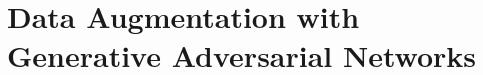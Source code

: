 \chapter[Data Augmentation with Generative Adversarial Networks]{Data
Augmentation with \\ Generative Adversarial Networks}
\label{ch:gan}









